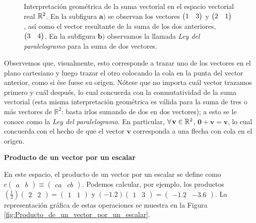 \documentclass[12pt,dvipsnames]{article}
\begin{document}
\begin{figure}[h!]
        \caption{Interpretación geométrica de la suma vectorial en el espacio vectorial real $\protect\mathbb{R}^2$. En la subfigura $\textbf{a)}$ se observan los vectores $\protect\begin{pmatrix} 1 & 3 \protect\end{pmatrix}$ y $\protect\begin{pmatrix} 2 & 1 \protect\end{pmatrix}$, así como el vector resultante de la suma de los dos anteriores, $\protect\begin{pmatrix} 3 & 4 \protect\end{pmatrix}$. En la subfigura $\textbf{b)}$ observamos la llamada \emph{Ley del paralelogramo} para la suma de dos vectores.}
    \label{fig:Suma_vectorial}
\end{figure}

    Observemos que, visualmente, esto corresponde a trazar uno de los vectores en el plano cartesiano y luego trazar el otro colocando la cola en la punta del vector anterior, como si ése fuese su origen. Nótese que no importa cuál vector trazamos primero y cuál después, lo cual concuerda con la conmutatividad de la suma vectorial (esta misma interpretación geométrica es válida para la suma de tres o más vectores de $\mathbb{R}^2$: basta irlos sumando de dos en dos vectores); a esto se le conoce como la \textit{Ley del paralelogramo}. En particular, $\forall\hspace{0.5mm} \mathbf{v} \in \mathbb{R}^2$, $\mathbf{0}+\mathbf{v}=\mathbf{v}$, lo cual concuerda con el hecho de que el vector $\mathbf{v}$ corresponda a una flecha con cola en el origen.

\vspace{3mm}
\textbf{Producto de un vector por un escalar}
\vspace{3mm}

        En este espacio, el producto de un vector por un escalar se define como $c\begin{pmatrix}a&b\end{pmatrix}\equiv\begin{pmatrix}ca&cb\end{pmatrix}$. Podemos calcular, por ejemplo, los productos $(\frac{1}{2})\begin{pmatrix}2&2\end{pmatrix}=\begin{pmatrix}1&1\end{pmatrix}$ y $(-1.2)\begin{pmatrix}1&3\end{pmatrix}=\begin{pmatrix}-1.2&-3.6\end{pmatrix}$. La representación gráfica de estas operaciones se muestra en la Figura \ref{fig:Producto_de_un_vector_por_un_escalar}.
\end{document}
